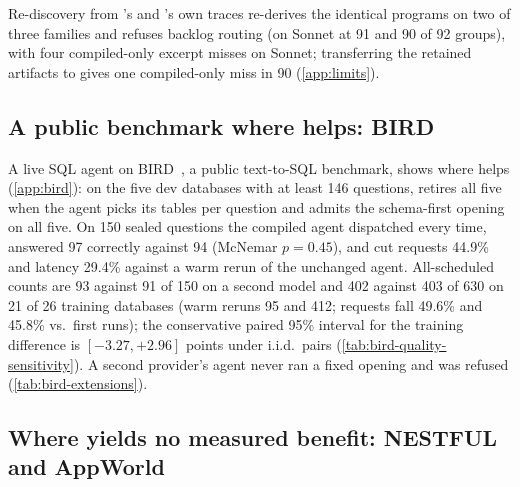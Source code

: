 Re-discovery from 's and 's own traces
re-derives the identical programs on two of three families and refuses backlog
routing (on Sonnet at 91 and 90 of 92 groups), with four compiled-only excerpt
misses on Sonnet; transferring the retained artifacts to  gives
one compiled-only miss in 90 (\cref{app:limits}).

\subsection{A public benchmark where \method helps: BIRD}
\label{sec:res-bird}

A live SQL agent on BIRD~\citep{li2023bird}, a public text-to-SQL benchmark,
shows where \method helps (\cref{app:bird}): on the five dev databases with at
least 146 questions, \method retires all five when the agent picks its tables
per question and admits the schema-first opening on all five. On 150 sealed
questions the compiled agent dispatched every time, answered 97 correctly
against 94 (McNemar $p=0.45$), and cut requests 44.9\% and latency 29.4\%
against a warm rerun of the unchanged agent. All-scheduled counts are 93 against
91 of 150 on a second model and 402 against 403 of 630 on 21 of 26 training
databases (warm reruns 95 and 412; requests fall 49.6\% and 45.8\% vs.\ first runs); the conservative paired 95\%
interval for the training difference is $[-3.27,+2.96]$ points under i.i.d.\
pairs (\cref{tab:bird-quality-sensitivity}). A second provider's agent never ran
a fixed opening and was refused (\cref{tab:bird-extensions}).

\subsection{Where \method yields no measured benefit: NESTFUL and AppWorld}
\label{sec:res-refusal}

\begin{table}[t]
  \centering
  \caption{The two trace benchmarks with no measured \method benefit (all four in
  \cref{tab:funnel-all}); parenthesized numbers are pipeline stages
  (\cref{fig:pipeline}). Key: \emph{grounded slots} is the share of dependency
  slots with a recovered producer; \emph{at floor} counts families meeting the
  stage-2 support minimum ($\ge5$ groups on NESTFUL, $\ge3$ elsewhere);
  $n_{\max}$ is the largest family support (\cref{eq:cp} requires 92);
  \emph{pass / abstain / wrong} counts the \emph{family-level} replay split, not
  the 11/11 admission test split (\cref{app:external}). AppWorld shows effect
  arm A.}
  \label{tab:funnel}
  \footnotesize
  \setlength{\tabcolsep}{2.5pt}
  
\end{table}

